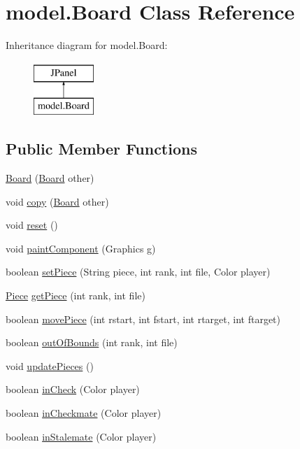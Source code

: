 \hypertarget{classmodel_1_1_board}{\section{model.\-Board Class Reference}
\label{classmodel_1_1_board}
}
Inheritance diagram for model.\-Board\-:\begin{figure}[H]
\begin{center}
\leavevmode
\includegraphics[height=2.000000cm]{classmodel_1_1_board}
\end{center}
\end{figure}
\subsection*{Public Member Functions}
\begin{DoxyCompactItemize}
\item 
\hyperlink{classmodel_1_1_board_aac7c0f18953f62b56fe1631dedc218ea}{Board} (\hyperlink{classmodel_1_1_board}{Board} other)
\item 
void \hyperlink{classmodel_1_1_board_ac230b4f661035db4d987134a91ab5cd4}{copy} (\hyperlink{classmodel_1_1_board}{Board} other)
\item 
void \hyperlink{classmodel_1_1_board_ab04268464780a556231843bfaca1f7bc}{reset} ()
\item 
void \hyperlink{classmodel_1_1_board_a00a494387b91835dbbc9c32ef253ca12}{paint\-Component} (Graphics g)
\item 
boolean \hyperlink{classmodel_1_1_board_a6578fe85a178404aa4da310dc28df012}{set\-Piece} (String piece, int rank, int file, Color player)
\item 
\hyperlink{classpieces_1_1_piece}{Piece} \hyperlink{classmodel_1_1_board_a516e546153648407b07174eeac9118d8}{get\-Piece} (int rank, int file)
\item 
boolean \hyperlink{classmodel_1_1_board_ad7df4bb61e00f8744f5593c2c8bd74a1}{move\-Piece} (int rstart, int fstart, int rtarget, int ftarget)
\item 
boolean \hyperlink{classmodel_1_1_board_aec15006cd7900c2b650b6f5dbeb35919}{out\-Of\-Bounds} (int rank, int file)
\item 
void \hyperlink{classmodel_1_1_board_ad96529c09bb3bef7dd29eae0a7d65cd8}{update\-Pieces} ()
\item 
boolean \hyperlink{classmodel_1_1_board_a55796d2d3a30e97826d734d79cde4d72}{in\-Check} (Color player)
\item 
boolean \hyperlink{classmodel_1_1_board_ae3d70f6d7bf853a60cbefb6872b73b3d}{in\-Checkmate} (Color player)
\item 
boolean \hyperlink{classmodel_1_1_board_a8758e5343f5a3dc5f965b622ebf012e3}{in\-Stalemate} (Color player)
\end{DoxyCompactItemize}


